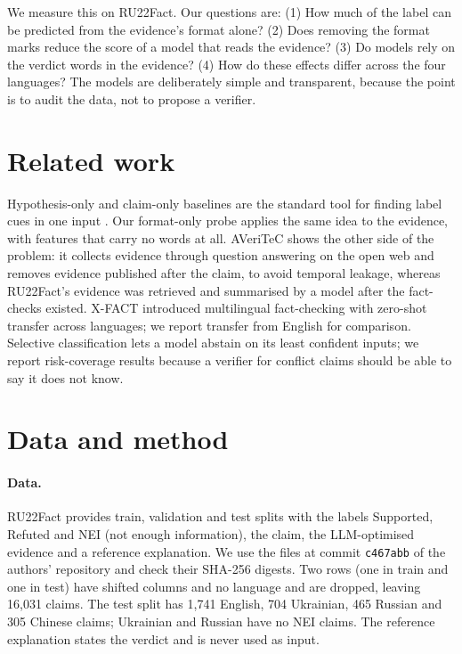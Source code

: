 \documentclass[11pt,a4paper]{article}
\newcommand{\code}[1]{\texttt{#1}}
\begin{document}
We measure this on RU22Fact. Our questions are: (1) How much of the label can be predicted from the evidence's format
alone? (2) Does removing the format marks reduce the score of a model that reads the evidence? (3) Do models rely on the
verdict words in the evidence? (4) How do these effects differ across the four languages? The models are deliberately simple
and transparent, because the point is to audit the data, not to propose a verifier.

\section{Related work}

Hypothesis-only and claim-only baselines are the standard tool for finding label cues in one input
\citep{poliak2018hypothesis,gururangan2018annotation,schuster2019debiasing}. Our format-only probe applies the same
idea to the evidence, with features that carry no words at all. AVeriTeC \citep{schlichtkrull2023averitec} shows the
other side of the problem: it collects evidence through question answering on the open web and removes evidence
published after the claim, to avoid temporal leakage, whereas RU22Fact's evidence was retrieved and summarised by a
model after the fact-checks existed. X-FACT \citep{gupta2021xfact} introduced multilingual
fact-checking with zero-shot transfer across languages; we report transfer from English for comparison. Selective
classification \citep{geifman2017selective} lets a model abstain on its least confident inputs; we report
risk-coverage results because a verifier for conflict claims should be able to say it does not know.

\section{Data and method}

\paragraph{Data.} RU22Fact \citep{zeng2024ru22fact} provides train, validation and test splits with the labels
Supported, Refuted and NEI (not enough information), the claim, the LLM-optimised evidence and a reference explanation.
We use the files at commit \code{c467abb} of the authors' repository and check their SHA-256 digests. Two rows
(one in train and one in test) have shifted columns and no language and are dropped, leaving 16,031 claims. The test
split has 1,741 English, 704 Ukrainian, 465 Russian and 305 Chinese claims; Ukrainian and Russian have no NEI claims.
The reference explanation states the verdict and is never used as input.
\end{document}
